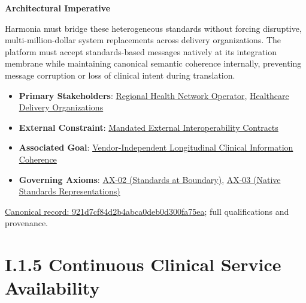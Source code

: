 \par\medskip\textbf{Architectural Imperative}\par


Harmonia must bridge these heterogeneous standards without forcing disruptive, multi-million-dollar system replacements across delivery organizations. The platform must accept standards-based messages natively at its integration membrane while maintaining canonical semantic coherence internally, preventing message corruption or loss of clinical intent during translation.



\begin{itemize}


\item \textbf{Primary Stakeholders}: \href{\detokenize{../../../../../docs/markdown/01-motivation/stakeholders/enterprise-stakeholders.md}}{Regional Health Network Operator}, \href{\detokenize{../../../../../docs/markdown/01-motivation/stakeholders/enterprise-stakeholders.md}}{Healthcare Delivery Organizations}

\item \textbf{External Constraint}: \href{\detokenize{../../../../../docs/markdown/01-motivation/requirements-constraints/external-constraints.md}}{Mandated External Interoperability Contracts}

\item \textbf{Associated Goal}: \href{\detokenize{../../../../../docs/markdown/01-motivation/goals-outcomes/strategic-goals.md}}{Vendor-Independent Longitudinal Clinical Information Coherence}

\item \textbf{Governing Axioms}: \hyperref[element:eee8c3783d964d18a7f9dcea85fcd4cf]{AX-02 (Standards at Boundary)}, \hyperref[element:e99a4e2bf99f476d876394300d6b9c3d]{AX-03 (Native Standards Representations)}

\end{itemize}

{\footnotesize \href{../../../../continuum/motivation/driver/921d7cf84d2b4abca0deb0d300fa75ea.md}{Canonical record: 921d7cf84d2b4abca0deb0d300fa75ea}; full qualifications and provenance.}\par
\section*{I.1.5 Continuous Clinical Service Availability}
\label{navigation:I.1.5}

